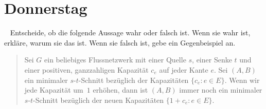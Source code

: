 \documentclass{uebung_cs}
\begin{document}
\section*{Donnerstag}

\begin{aufgabe}\
    Entscheide, ob die folgende Aussage wahr oder falsch ist. Wenn sie wahr ist, erkläre, warum sie das ist. Wenn sie falsch ist, gebe ein Gegenbeispiel an.
    
    \begin{quote}
        Sei $G$ ein beliebiges Flussnetzwerk mit einer Quelle $s$, einer Senke $t$ und einer positiven, ganzzahligen Kapazität $c_e$ auf jeder Kante $e$. Sei $(A,B)$ ein minimaler $s$-$t$-Schnitt bezüglich der Kapazitäten $\{c_e : e \in E\}$. Wenn wir jede Kapazität um~$1$ erhöhen, dann ist $(A,B)$ immer noch ein minimaler $s$-$t$-Schnitt bezüglich der neuen Kapazitäten $\{1 + c_e : e \in E\}$.
    \end{quote}
\end{aufgabe}
\end{document}
